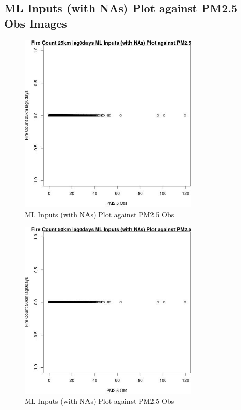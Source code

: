 
\subsection{ML Inputs (with NAs) Plot against PM2.5 Obs Images} 
 

\begin{figure} 
\centering  
\includegraphics[width=0.77\textwidth]{Code_Outputs/Report_ML_input_PM25_Step4_part_e_de_duplicated_aves_compiled_2019-05-18wNAs_Fire_Count_25km_lag0daysvPM25_Obs.jpg} 
\caption{\label{fig:Report_ML_input_PM25_Step4_part_e_de_duplicated_aves_compiled_2019-05-18wNAsFire_Count_25km_lag0daysvPM25_Obs}ML Inputs (with NAs) Plot against PM2.5 Obs} 
\end{figure} 
 

\begin{figure} 
\centering  
\includegraphics[width=0.77\textwidth]{Code_Outputs/Report_ML_input_PM25_Step4_part_e_de_duplicated_aves_compiled_2019-05-18wNAs_Fire_Count_50km_lag0daysvPM25_Obs.jpg} 
\caption{\label{fig:Report_ML_input_PM25_Step4_part_e_de_duplicated_aves_compiled_2019-05-18wNAsFire_Count_50km_lag0daysvPM25_Obs}ML Inputs (with NAs) Plot against PM2.5 Obs} 
\end{figure} 
 

